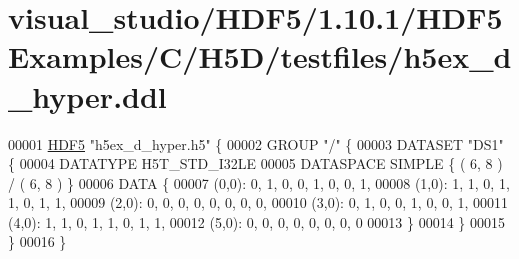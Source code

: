 \hypertarget{visual__studio_2_h_d_f5_21_810_81_2_h_d_f5_examples_2_c_2_h5_d_2testfiles_2h5ex__d__hyper_8ddl_source}{}\section{visual\+\_\+studio/\+H\+D\+F5/1.10.1/\+H\+D\+F5\+Examples/\+C/\+H5\+D/testfiles/h5ex\+\_\+d\+\_\+hyper.ddl}
\label{visual__studio_2_h_d_f5_21_810_81_2_h_d_f5_examples_2_c_2_h5_d_2testfiles_2h5ex__d__hyper_8ddl_source}

\begin{DoxyCode}
00001 \hyperlink{namespace_h_d_f5}{HDF5} \textcolor{stringliteral}{"h5ex\_d\_hyper.h5"} \{
00002 GROUP \textcolor{stringliteral}{"/"} \{
00003    DATASET \textcolor{stringliteral}{"DS1"} \{
00004       DATATYPE  H5T\_STD\_I32LE
00005       DATASPACE  SIMPLE \{ ( 6, 8 ) / ( 6, 8 ) \}
00006       DATA \{
00007       (0,0): 0, 1, 0, 0, 1, 0, 0, 1,
00008       (1,0): 1, 1, 0, 1, 1, 0, 1, 1,
00009       (2,0): 0, 0, 0, 0, 0, 0, 0, 0,
00010       (3,0): 0, 1, 0, 0, 1, 0, 0, 1,
00011       (4,0): 1, 1, 0, 1, 1, 0, 1, 1,
00012       (5,0): 0, 0, 0, 0, 0, 0, 0, 0
00013       \}
00014    \}
00015 \}
00016 \}
\end{DoxyCode}
